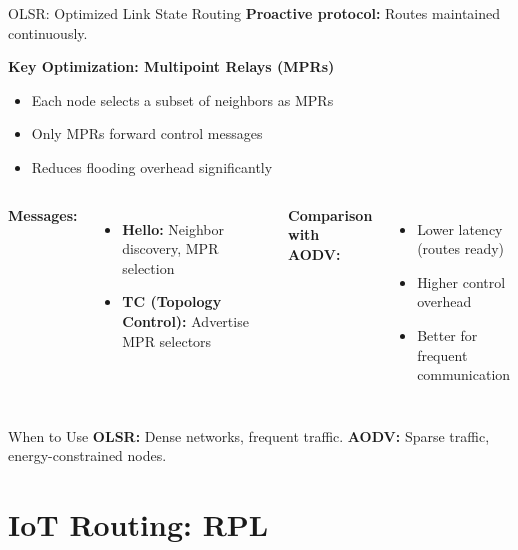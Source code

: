 \documentclass[aspectratio=169,11pt]{beamer}
\begin{document}
\begin{frame}{OLSR: Optimized Link State Routing}
    \textbf{Proactive protocol:} Routes maintained continuously.
    
    \vspace{0.3cm}
    \textbf{Key Optimization: Multipoint Relays (MPRs)}
    \begin{itemize}
        \item Each node selects a subset of neighbors as MPRs
        \item Only MPRs forward control messages
        \item Reduces flooding overhead significantly
    \end{itemize}
    
    \vspace{0.3cm}
    \begin{columns}
        \textbf{Messages:}
        \begin{itemize}
            \item \textbf{Hello:} Neighbor discovery, MPR selection
            \item \textbf{TC (Topology Control):} Advertise MPR selectors
        \end{itemize}
        
        \textbf{Comparison with AODV:}
        \begin{itemize}
            \item Lower latency (routes ready)
            \item Higher control overhead
            \item Better for frequent communication
        \end{itemize}
    \end{columns}
    
    \vspace{0.3cm}
    \begin{alertblock}{When to Use}
        \textbf{OLSR:} Dense networks, frequent traffic. \textbf{AODV:} Sparse traffic, energy-constrained nodes.
    \end{alertblock}
\end{frame}

\section{IoT Routing: RPL}
\end{document}
